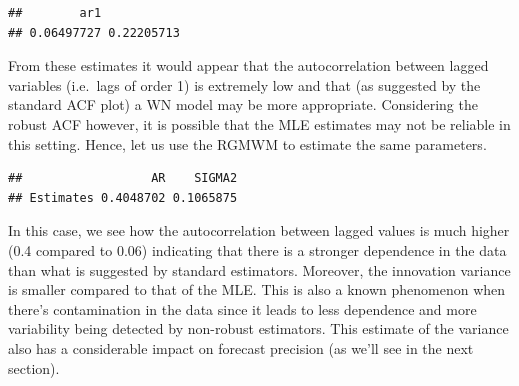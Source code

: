 \documentclass[]{book}
\newenvironment{Shaded}{\begin{snugshade}}{\end{snugshade}}
\newcommand{\CommentTok}[1]{\textcolor[rgb]{0.56,0.35,0.01}{\textit{#1}}}
\newcommand{\DataTypeTok}[1]{\textcolor[rgb]{0.13,0.29,0.53}{#1}}
\newcommand{\DecValTok}[1]{\textcolor[rgb]{0.00,0.00,0.81}{#1}}
\newcommand{\KeywordTok}[1]{\textcolor[rgb]{0.13,0.29,0.53}{\textbf{#1}}}
\newcommand{\NormalTok}[1]{#1}
\newcommand{\OperatorTok}[1]{\textcolor[rgb]{0.81,0.36,0.00}{\textbf{#1}}}
\newcommand{\OtherTok}[1]{\textcolor[rgb]{0.56,0.35,0.01}{#1}}
\newcommand{\StringTok}[1]{\textcolor[rgb]{0.31,0.60,0.02}{#1}}
\theoremstyle{definition}
\theoremstyle{definition}
\theoremstyle{definition}
\theoremstyle{remark}
\begin{document}
\begin{Shaded}
\end{Shaded}

\begin{verbatim}
##        ar1            
## 0.06497727 0.22205713
\end{verbatim}

From these estimates it would appear that the autocorrelation between
lagged variables (i.e.~lags of order 1) is extremely low and that (as
suggested by the standard ACF plot) a WN model may be more appropriate.
Considering the robust ACF however, it is possible that the MLE
estimates may not be reliable in this setting. Hence, let us use the
RGMWM to estimate the same parameters.

\begin{Shaded}
\end{Shaded}

\begin{verbatim}
##                  AR    SIGMA2
## Estimates 0.4048702 0.1065875
\end{verbatim}

In this case, we see how the autocorrelation between lagged values is
much higher (0.4 compared to 0.06) indicating that there is a stronger
dependence in the data than what is suggested by standard estimators.
Moreover, the innovation variance is smaller compared to that of the
MLE. This is also a known phenomenon when there's contamination in the
data since it leads to less dependence and more variability being
detected by non-robust estimators. This estimate of the variance also
has a considerable impact on forecast precision (as we'll see in the
next section).
\end{document}

